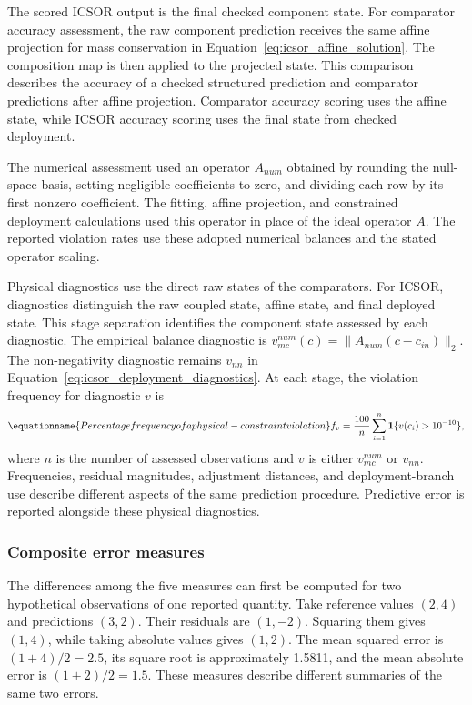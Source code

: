 The scored ICSOR output is the final checked component state. For comparator accuracy assessment, the raw component prediction receives the same affine projection for mass conservation in Equation~\eqref{eq:icsor_affine_solution}. The composition map is then applied to the projected state. This comparison describes the accuracy of a checked structured prediction and comparator predictions after affine projection. Comparator accuracy scoring uses the affine state, while ICSOR accuracy scoring uses the final state from checked deployment.

The numerical assessment used an operator \(A_{num}\) obtained by rounding the null-space basis, setting negligible coefficients to zero, and dividing each row by its first nonzero coefficient. The fitting, affine projection, and constrained deployment calculations used this operator in place of the ideal operator \(A\). The reported violation rates use these adopted numerical balances and the stated operator scaling.

Physical diagnostics use the direct raw states of the comparators. For ICSOR, diagnostics distinguish the raw coupled state, affine state, and final deployed state. This stage separation identifies the component state assessed by each diagnostic. The empirical balance diagnostic is \(v_{mc}^{num}(c)=\|A_{num}(c-c_{in})\|_2\). The non-negativity diagnostic remains \(v_{nn}\) in Equation~\eqref{eq:icsor_deployment_diagnostics}. At each stage, the violation frequency for diagnostic \(v\) is
\begin{equation}
\equationname{Percentage frequency of a physical-constraint violation}
\label{eq:icsor_violation_frequency}
f_v=\frac{100}{n}\sum_{i=1}^{n}
\mathbf{1}\{v(c_i)>10^{-10}\},
\end{equation}
where \(n\) is the number of assessed observations and \(v\) is either \(v_{mc}^{num}\) or \(v_{nn}\). Frequencies, residual magnitudes, adjustment distances, and deployment-branch use describe different aspects of the same prediction procedure. Predictive error is reported alongside these physical diagnostics.

\subsubsection{Composite error measures}

The differences among the five measures can first be computed for two hypothetical observations of one reported quantity. Take reference values \((2,4)\) and predictions \((3,2)\). Their residuals are \((1,-2)\). Squaring them gives \((1,4)\), while taking absolute values gives \((1,2)\). The mean squared error is \((1+4)/2=2.5\), its square root is approximately 1.5811, and the mean absolute error is \((1+2)/2=1.5\). These measures describe different summaries of the same two errors.

